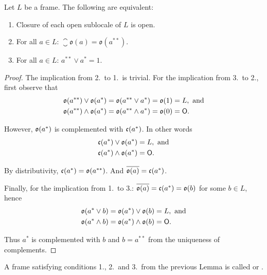 \begin{lemma}
    Let $L$ be a frame. The following are equivalent:

    \begin{enumerate}
        \item Closure of each open sublocale of $L$ is open.
        \item For all $a \in L$: $\closure{\mathfrak{o}(a)} = \mathfrak{o}(a^{**})$.
        \item For all $a \in L$: $a^{**} \vee a^* = 1$.
    \end{enumerate}
\end{lemma}
\begin{proof}
    The implication from 2.\ to 1.\ is trivial. For the implication from 3.\ to 2., first observe that
    \begin{align*}
        \mathfrak{o}(a^{**})\vee \mathfrak{o}(a^*) &= \mathfrak{o}(a^{**}\vee a^*) = \mathfrak{o}(1) = L, \text{ and} \\
        \mathfrak{o}(a^{**})\wedge \mathfrak{o}(a^*) &= \mathfrak{o}(a^{**}\wedge a^*) = \mathfrak{o}(0) = \mathsf{O}.
    \end{align*}

    \noindent However, $\mathfrak{o}(a^*)$ is complemented with $\mathfrak{c}(a^*)$. In other words
    \begin{align*}
        \mathfrak{c}(a^*)\vee \mathfrak{o}(a^*) &= L, \text{ and} \\
        \mathfrak{c}(a^*)\wedge \mathfrak{o}(a^*) &= \mathsf{O}.
    \end{align*}

    \noindent By distributivity, $\mathfrak{c}(a^*) = \mathfrak{o}(a^{**})$. And $\overline{\mathfrak{o}(a)} = \mathfrak{c}(a^*)$.

    Finally, for the implication from 1.\ to 3.: $\overline{\mathfrak{o}(a)} = \mathfrak{c}(a^*) = \mathfrak{o}(b)$ for some $b \in L$, hence
    \begin{align*}
        \mathfrak{o}(a^*\vee b) &= \mathfrak{o}(a^*)\vee   \mathfrak{o}(b) = L, \text{ and} \\
        \mathfrak{o}(a^*\wedge b) &= \mathfrak{o}(a^*)\wedge \mathfrak{o}(b) = \mathsf{O}.
    \end{align*}

    \noindent Thus $a^*$ is complemented with $b$ and $b = a^{**}$ from the uniqueness of complements.
\end{proof}

\begin{definition}
    A frame satisfying conditions 1., 2.\ and 3.\ from the previous Lemma is called  or .
\end{definition}

